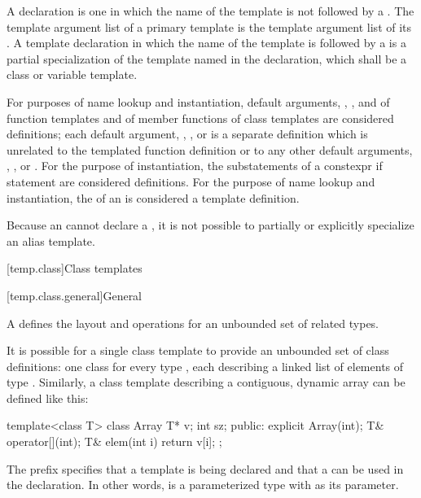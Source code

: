 \pnum
A  declaration is one
in which the name of the template is not followed by
a .
The template argument list of a primary template is
the template argument list of its .
A template declaration in which the name of the template is followed by
a  is
a partial specialization of
the template named in the declaration,
which shall be a class or variable template.

\pnum
For purposes of name lookup and instantiation,
default arguments,
,
,
and
of function templates
and
of member functions of class templates
are considered definitions;
each
default argument,
,
,
or
is a separate definition
which is unrelated
to the templated function definition or
to any other
default arguments,
,
,
or
.
For the purpose of instantiation, the substatements of a constexpr if
statement are considered definitions.
For the purpose of name lookup and instantiation,
the  of an 
is considered a template definition.

\pnum
Because an  cannot declare a
, it is not possible to partially or
explicitly specialize an alias template.

[temp.class]{Class templates}

[temp.class.general]{General}

\pnum
A
defines the layout and operations
for an unbounded set of related types.

\pnum
\begin{example}
It is possible for a single class template
to provide an unbounded set of class definitions:
one class  for every type ,
each describing a linked list of elements of type .
Similarly, a class template  describing a contiguous,
dynamic array can be defined like this:
\begin{codeblock}
template<class T> class Array {
  T* v;
  int sz;
public:
  explicit Array(int);
  T& operator[](int);
  T& elem(int i) { return v[i]; }
};
\end{codeblock}
The prefix 
specifies that a template is being declared and that a
 
can be used in the declaration.
In other words,
is a parameterized type with
as its parameter.
\end{example}

